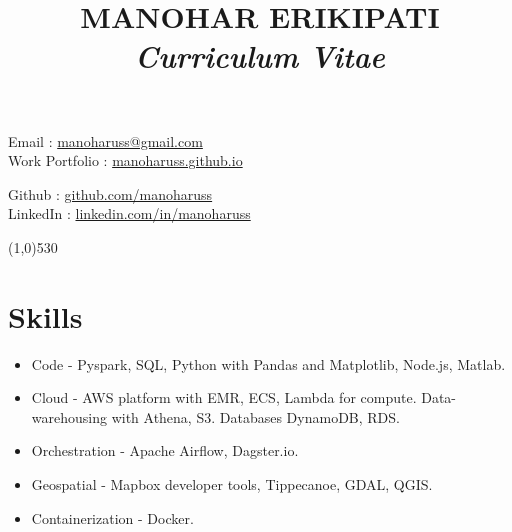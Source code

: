 \documentclass[11pt]{article}
\title{\bfseries MANOHAR ERIKIPATI \\ \large \textit {Curriculum Vitae}}
\date{}
\begin{document}
\maketitle

\vspace{-8.55em}
\begin{minipage}[ht]{0.58\textwidth}
Email : \href{mailto:manoharuss@gmail.com}{manoharuss@gmail.com} \\
Work Portfolio : \href{https://manoharuss.github.io/}{manoharuss.github.io}
\end{minipage}
\begin{minipage}[ht]{0.58\textwidth}
\hfill \break
\hfill \break
Github : \href{http://github.com/manoharuss}{github.com/manoharuss} \\
LinkedIn : \href{https://www.linkedin.com/in/manoharuss/}{linkedin.com/in/manoharuss} \\
\end{minipage}
\line(1,0){530}

\section*{Skills}
\begin{itemize}[noitemsep]
\item Code - Pyspark, SQL, Python with Pandas and Matplotlib, Node.js, Matlab.
\item Cloud - AWS platform with EMR, ECS, Lambda for compute. Data-warehousing with Athena, S3. Databases DynamoDB, RDS.
\item Orchestration - Apache Airflow, Dagster.io.
\item Geospatial - Mapbox developer tools, Tippecanoe, GDAL, QGIS.
\item Containerization - Docker.
\end{itemize}
\end{document}
